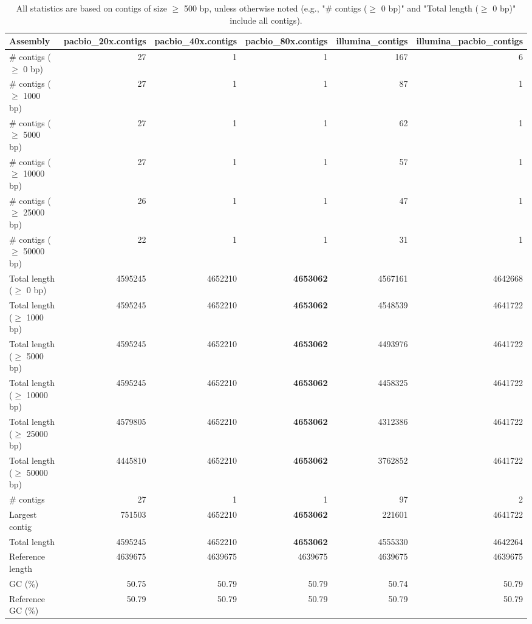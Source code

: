 \documentclass[12pt,a4paper]{article}
\begin{document}
\begin{table}[ht]
\begin{center}
\caption{All statistics are based on contigs of size $\geq$ 500 bp, unless otherwise noted (e.g., "\# contigs ($\geq$ 0 bp)" and "Total length ($\geq$ 0 bp)" include all contigs).}
\begin{tabular}{|l*{5}{|r}|}
\hline
Assembly & pacbio\_20x.contigs & pacbio\_40x.contigs & pacbio\_80x.contigs & illumina\_contigs & illumina\_pacbio\_contigs \\ \hline
\# contigs ($\geq$ 0 bp) & 27 & 1 & 1 & 167 & 6 \\ \hline
\# contigs ($\geq$ 1000 bp) & 27 & 1 & 1 & 87 & 1 \\ \hline
\# contigs ($\geq$ 5000 bp) & 27 & 1 & 1 & 62 & 1 \\ \hline
\# contigs ($\geq$ 10000 bp) & 27 & 1 & 1 & 57 & 1 \\ \hline
\# contigs ($\geq$ 25000 bp) & 26 & 1 & 1 & 47 & 1 \\ \hline
\# contigs ($\geq$ 50000 bp) & 22 & 1 & 1 & 31 & 1 \\ \hline
Total length ($\geq$ 0 bp) & 4595245 & 4652210 & {\bf 4653062} & 4567161 & 4642668 \\ \hline
Total length ($\geq$ 1000 bp) & 4595245 & 4652210 & {\bf 4653062} & 4548539 & 4641722 \\ \hline
Total length ($\geq$ 5000 bp) & 4595245 & 4652210 & {\bf 4653062} & 4493976 & 4641722 \\ \hline
Total length ($\geq$ 10000 bp) & 4595245 & 4652210 & {\bf 4653062} & 4458325 & 4641722 \\ \hline
Total length ($\geq$ 25000 bp) & 4579805 & 4652210 & {\bf 4653062} & 4312386 & 4641722 \\ \hline
Total length ($\geq$ 50000 bp) & 4445810 & 4652210 & {\bf 4653062} & 3762852 & 4641722 \\ \hline
\# contigs & 27 & 1 & 1 & 97 & 2 \\ \hline
Largest contig & 751503 & 4652210 & {\bf 4653062} & 221601 & 4641722 \\ \hline
Total length & 4595245 & 4652210 & {\bf 4653062} & 4555330 & 4642264 \\ \hline
Reference length & 4639675 & 4639675 & 4639675 & 4639675 & 4639675 \\ \hline
GC (\%) & 50.75 & 50.79 & 50.79 & 50.74 & 50.79 \\ \hline
Reference GC (\%) & 50.79 & 50.79 & 50.79 & 50.79 & 50.79 \\ \hline

\end{tabular}
\end{center}
\end{table}
\end{document}
